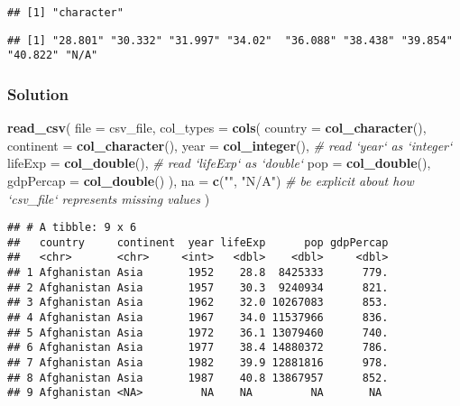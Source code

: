 \documentclass[
]{book}
\newenvironment{Shaded}{\begin{snugshade}}{\end{snugshade}}
\newcommand{\CommentTok}[1]{\textcolor[rgb]{0.56,0.35,0.01}{\textit{#1}}}
\newcommand{\DataTypeTok}[1]{\textcolor[rgb]{0.13,0.29,0.53}{#1}}
\newcommand{\KeywordTok}[1]{\textcolor[rgb]{0.13,0.29,0.53}{\textbf{#1}}}
\newcommand{\NormalTok}[1]{#1}
\newcommand{\OperatorTok}[1]{\textcolor[rgb]{0.81,0.36,0.00}{\textbf{#1}}}
\newcommand{\StringTok}[1]{\textcolor[rgb]{0.31,0.60,0.02}{#1}}
\begin{document}
\begin{verbatim}
## [1] "character"
\end{verbatim}

\begin{Shaded}
\end{Shaded}

\begin{verbatim}
## [1] "28.801" "30.332" "31.997" "34.02"  "36.088" "38.438" "39.854" "40.822" "N/A"
\end{verbatim}

\hypertarget{solution}{%
\subsubsection{Solution}\label{solution}}

\begin{Shaded}
\begin{Highlighting}[]
\KeywordTok{read_csv}\NormalTok{(}
  \DataTypeTok{file =}\NormalTok{ csv_file,}
  \DataTypeTok{col_types =} \KeywordTok{cols}\NormalTok{(}
    \DataTypeTok{country =} \KeywordTok{col_character}\NormalTok{(),}
    \DataTypeTok{continent =} \KeywordTok{col_character}\NormalTok{(),}
    \DataTypeTok{year =} \KeywordTok{col_integer}\NormalTok{(),        }\CommentTok{# read `year` as `integer`}
    \DataTypeTok{lifeExp =} \KeywordTok{col_double}\NormalTok{(),      }\CommentTok{# read `lifeExp` as `double`}
    \DataTypeTok{pop =} \KeywordTok{col_double}\NormalTok{(),}
    \DataTypeTok{gdpPercap =} \KeywordTok{col_double}\NormalTok{()}
\NormalTok{  ),}
  \DataTypeTok{na =} \KeywordTok{c}\NormalTok{(}\StringTok{""}\NormalTok{, }\StringTok{"N/A"}\NormalTok{)              }\CommentTok{# be explicit about how `csv_file` represents missing values}
\NormalTok{)}
\end{Highlighting}
\end{Shaded}

\begin{verbatim}
## # A tibble: 9 x 6
##   country     continent  year lifeExp      pop gdpPercap
##   <chr>       <chr>     <int>   <dbl>    <dbl>     <dbl>
## 1 Afghanistan Asia       1952    28.8  8425333      779.
## 2 Afghanistan Asia       1957    30.3  9240934      821.
## 3 Afghanistan Asia       1962    32.0 10267083      853.
## 4 Afghanistan Asia       1967    34.0 11537966      836.
## 5 Afghanistan Asia       1972    36.1 13079460      740.
## 6 Afghanistan Asia       1977    38.4 14880372      786.
## 7 Afghanistan Asia       1982    39.9 12881816      978.
## 8 Afghanistan Asia       1987    40.8 13867957      852.
## 9 Afghanistan <NA>         NA    NA         NA       NA
\end{verbatim}
\end{document}
